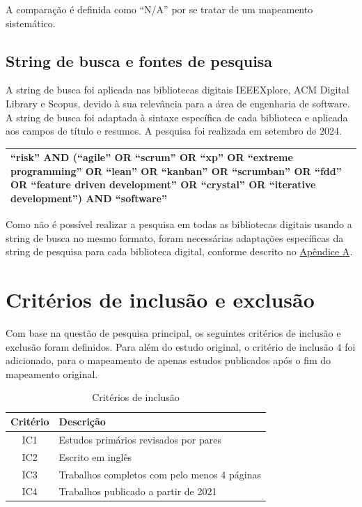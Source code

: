 \documentclass[
	12pt,
	openright,
	twoside,
	a4paper,
	english,
	brazil
	]{abntex2}
\begin{document}
A comparação é definida como “N/A” por se tratar de um mapeamento sistemático.


\subsection{String de busca e fontes de pesquisa}

A string de busca foi aplicada nas bibliotecas digitais IEEEXplore, ACM Digital Library e Scopus, devido à sua relevância para a área de engenharia de software. A string de busca foi adaptada à sintaxe específica de cada biblioteca e aplicada aos campos de título e resumos. A pesquisa foi realizada em setembro de 2024.

\begin{table}[h!]
  \centering
  \begin{tabular}{|p{15cm}|}
  \hline
  “risk” AND (“agile” OR “scrum” OR “xp” OR “extreme programming” OR “lean” OR “kanban” OR “scrumban” OR “fdd” OR “feature driven development” OR “crystal” OR “iterative development”) AND “software” \\ \hline
  \end{tabular}
  \label{tab:consulta-pesquisa}
\end{table}

Como não é possível realizar a pesquisa em todas as bibliotecas digitais usando a string de busca no mesmo formato, foram necessárias adaptações específicas da string de pesquisa para cada biblioteca digital, conforme descrito no \hyperref[apendiceA]{Apêndice A}.


\section{Critérios de inclusão e exclusão}

Com base na questão de pesquisa principal, os seguintes critérios de inclusão e exclusão foram definidos. Para além do estudo original, o critério de inclusão 4 foi adicionado, para o mapeamento de apenas estudos publicados após o fim do mapeamento original.

\begin{table}[H]
  \centering
  \caption{Critérios de inclusão}
  \begin{tabular}{|c|l|}
  \hline
  \textbf{Critério} & \textbf{Descrição} \\ \hline
  IC1 & Estudos primários revisados por pares \\ \hline
  IC2 & Escrito em inglês \\ \hline
  IC3 & Trabalhos completos com pelo menos 4 páginas \\ \hline
  IC4 & Trabalhos publicado a partir de 2021 \\ \hline
  \end{tabular}
\end{table}
\end{document}
